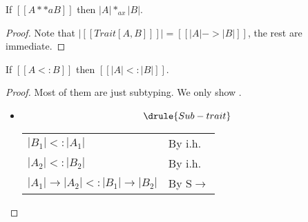 \begin{lemma} \label{lemma:disa}
  If $[[A **a B]]$ then $|A| *_{ax} |B|$.
\end{lemma}
\begin{proof}
  Note that $|[[ Trait[A,B] ]]| = [[|A| -> |B|]]$, the rest are immediate.
\end{proof}



\begin{lemma} \label{lemma:sub}
  If $[[A <: B]]$ then $[[|A| <: |B|]]$.
\end{lemma}
\begin{proof}
Most of them are just \bname subtyping. We only show .
\begin{itemize}
\item \[    \drule{Sub-trait} \]
  \begin{longtable}[l]{ll}
    $|B_1| <: |A_1|$ & By i.h. \\
    $|A_2| <: |B_2|$ & By i.h. \\
    $|A_1| \rightarrow |A_2| <: |B_1| \rightarrow |B_2|$ & By \textsc{S$\rightarrow$}
  \end{longtable}
\end{itemize}
\end{proof}



